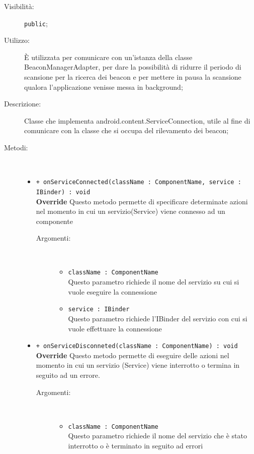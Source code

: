 \documentclass[../DefinizioneDiProdotto.tex]{subfiles}
\begin{document}
\begin{description}
\begin{itemize}
\end{itemize}
\item[Visibilità:] \texttt{public};
\item[Utilizzo:] È utilizzata per comunicare con un'istanza della classe BeaconManagerAdapter, per dare la possibilità di ridurre il periodo di scansione per la ricerca dei beacon e per mettere in pausa la scansione qualora l'applicazione venisse messa in background;
\item[Descrizione:] Classe che implementa android.content.ServiceConnection, utile al fine di comunicare con la classe che si occupa del rilevamento dei beacon;
\item[Metodi:] \
\begin{itemize}
\item \texttt{+ onServiceConnected(className : ComponentName, service : IBinder) : void}\\
\textbf{Override} Questo metodo permette di specificare determinate azioni nel momento in cui un servizio(Service) viene connesso ad un componente
 \begin{description}
\item[Argomenti:] \
\begin{itemize}
\item \texttt{className : ComponentName}\\
Questo parametro richiede il nome del servizio su cui si vuole eseguire la connessione\item \texttt{service : IBinder}\\
Questo parametro richiede l'IBinder del servizio con cui si vuole effettuare la connessione\end{itemize}
\end{description}
\item \texttt{+ onServiceDisconneted(className : ComponentName) : void}\\
\textbf{Override} Questo metodo permette di eseguire delle azioni nel momento in cui un servizio (Service) viene interrotto o termina in seguito ad un errore.
 \begin{description}
\item[Argomenti:] \
\begin{itemize}
\item \texttt{className : ComponentName}\\
Questo parametro richiede il nome del servizio che è stato interrotto o è terminato in seguito ad errori\end{itemize}
\end{description}
\end{itemize}
\end{description}
\end{document}
